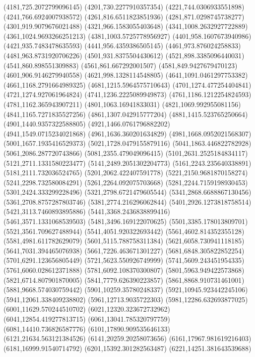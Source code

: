 {(4181,725.2072799096145)
(4201,730.2277910357354)
(4221,744.0306933551898)
(4241,766.6924007938572)
(4261,816.6511823851936)
(4281,871.0298745738277)
(4301,919.9079676021488)
(4321,966.1583055403648)
(4341,1008.2632927722889)
(4361,1024.9693266251213)
(4381,1003.5725778956927)
(4401,958.1607673940986)
(4421,935.7483478635593)
(4441,956.4359386505145)
(4461,973.876024258833)
(4481,963.8731920706226)
(4501,931.8375504430612)
(4521,898.3385096440031)
(4541,860.898551309883)
(4561,861.667292001507)
(4581,849.9427679470123)
(4601,906.9146279940558)
(4621,998.1328114548805)
(4641,1091.0461297753382)
(4661,1168.2791664989325)
(4681,1215.5964575710643)
(4701,1274.477254404841)
(4721,1274.927061964824)
(4741,1236.2225089949873)
(4761,1186.1212254824593)
(4781,1162.365943907211)
(4801,1063.16941833031)
(4821,1069.992955081156)
(4841,1165.7271835527256)
(4861,1307.042915777204)
(4881,1415.523765250664)
(4901,1440.9357322588805)
(4921,1466.0761796882202)
(4941,1549.0715234021868)
(4961,1636.360201634829)
(4981,1668.0952021568307)
(5001,1657.1935416529373)
(5021,1728.0479155879116)
(5041,1863.446822782928)
(5061,2086.287720743866)
(5081,2355.479049096415)
(5101,2631.2525184834117)
(5121,2711.1331580223477)
(5141,2489.2051302204773)
(5161,2243.235640338891)
(5181,2111.732036524765)
(5201,2062.422407591778)
(5221,2150.9681870158274)
(5241,2298.732580084291)
(5261,2264.092075703668)
(5281,2244.7159198930453)
(5301,2424.333299228496)
(5321,2798.6721479605544)
(5341,2868.6688867130456)
(5361,2708.8757287803746)
(5381,2774.216296062844)
(5401,2926.1273818758514)
(5421,3113.7460893895886)
(5441,3368.2436838899416)
(5461,3571.1331068539503)
(5481,3496.169122070625)
(5501,3385.178013809701)
(5521,3561.709627488944)
(5541,4051.920322693442)
(5561,4602.814352355128)
(5581,4981.611782629079)
(5601,5115.788758311384)
(5621,6058.730941118185)
(5641,7031.394465076938)
(5661,7226.463671301227)
(5681,6848.305822852254)
(5701,6291.123656805449)
(5721,5623.550926749999)
(5741,5609.243451954335)
(5761,6060.028612371888)
(5781,6092.108370300807)
(5801,5963.949422573868)
(5821,6714.807901870005)
(5841,7779.626390223857)
(5861,8868.910731461001)
(5881,9668.574030759442)
(5901,10259.35780248337)
(5921,10945.923442245106)
(5941,12061.338409238802)
(5961,12713.9035722303)
(5981,12286.632693877025)
(6001,11629.570244510702)
(6021,12320.323672732962)
(6041,12854.419277813715)
(6061,13041.785320797759)
(6081,14410.736826587776)
(6101,17890.909535646133)
(6121,21634.563121384526)
(6141,20259.20258073656)
(6161,17967.981619216403)
(6181,16999.91540714792)
(6201,15392.301282563487)
(6221,14251.381643539688)
}
